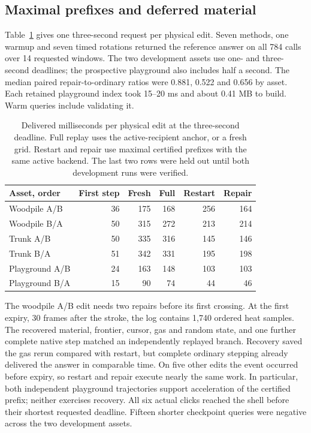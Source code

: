 \subsection{Maximal prefixes and deferred material}
Table~\ref{tab:prefix} gives one three-second request per physical edit. Seven methods, one warmup and seven timed rotations returned the reference answer on all 784 calls over 14 requested windows. The two development assets use one- and three-second deadlines; the prospective playground also includes half a second. The median paired repair-to-ordinary ratios were 0.881, 0.522 and 0.656 by asset. Each retained playground index took 15--20 ms and about 0.41 MB to build. Warm queries include validating it.

\begin{table}[t]
\caption{Delivered milliseconds per physical edit at the three-second deadline. Full replay uses the active-recipient anchor, or a fresh grid. Restart and repair use maximal certified prefixes with the same active backend. The last two rows were held out until both development runs were verified.}
\label{tab:prefix}
\centering\small
\begin{tabular}{lrrrrr}\toprule
Asset, order & First step & Fresh & Full & Restart & Repair\\ \midrule
Woodpile A/B & 36 & 175 & 168 & 256 & 164\\
Woodpile B/A & 50 & 315 & 272 & 213 & 214\\
Trunk A/B & 50 & 335 & 316 & 145 & 146\\
Trunk B/A & 51 & 342 & 331 & 195 & 198\\ \midrule
Playground A/B & 24 & 163 & 148 & 103 & 103\\
Playground B/A & 15 & 90 & 74 & 44 & 46\\ \bottomrule
\end{tabular}
\end{table}

The woodpile A/B edit needs two repairs before its first crossing. At the first expiry, 30 frames after the stroke, the log contains 1,740 ordered heat samples. The recovered material, frontier, cursor, gas and random state, and one further complete native step matched an independently replayed branch. Recovery saved the gas rerun compared with restart, but complete ordinary stepping already delivered the answer in comparable time. On five other edits the event occurred before expiry, so restart and repair execute nearly the same work. In particular, both independent playground trajectories support acceleration of the certified prefix; neither exercises recovery. All six actual clicks reached the shell before their shortest requested deadline. Fifteen shorter checkpoint queries were negative across the two development assets.

